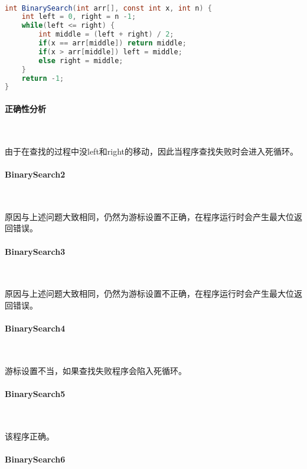\documentclass[UTF8]{ctexart}
\begin{document}
    ~

    \begin{small}
\begin{lstlisting}[language=java]
int BinarySearch(int arr[], const int x, int n) {
    int left = 0, right = n -1;
    while(left <= right) {
        int middle = (left + right) / 2;
        if(x == arr[middle]) return middle;
        if(x > arr[middle]) left = middle;
        else right = middle;
    }
    return -1;
}
\end{lstlisting}
\end{small}

    \paragraph{正确性分析}

    ~

    由于在查找的过程中没left和right的移动，因此当程序查找失败时会进入死循环。

    \paragraph{BinarySearch2}

    ~

    原因与上述问题大致相同，仍然为游标设置不正确，在程序运行时会产生最大位返回错误。

    \paragraph{BinarySearch3}

    ~

    原因与上述问题大致相同，仍然为游标设置不正确，在程序运行时会产生最大位返回错误。

    \paragraph{BinarySearch4}

    ~

    游标设置不当，如果查找失败程序会陷入死循环。

    \paragraph{BinarySearch5}

    ~

    该程序正确。

    \paragraph{BinarySearch6}
\end{document}
